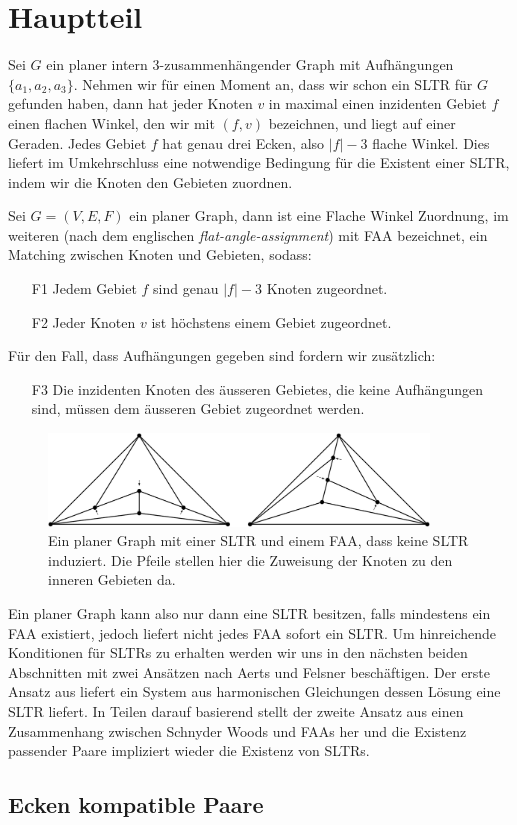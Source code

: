 \chapter{Hauptteil}

Sei $G$ ein planer intern 3-zusammenhängender Graph mit Aufhängungen $\{a_1,a_2,a_3\}$. Nehmen wir für einen Moment an, dass wir schon ein SLTR für $G$ gefunden haben, dann hat jeder Knoten $v$ in maximal einen inzidenten Gebiet $f$ einen flachen Winkel, den wir mit $(f,v)$ bezeichnen, und liegt auf einer Geraden. Jedes Gebiet $f$ hat genau drei Ecken, also $|f|-3$ flache Winkel. Dies liefert im Umkehrschluss eine notwendige Bedingung für die Existent einer SLTR, indem wir die Knoten den Gebieten zuordnen.

\begin{definition}[FAA]
Sei $G=(V,E,F)$ ein planer Graph, dann ist eine Flache Winkel Zuordnung, im weiteren (nach dem englischen \textit{flat-angle-assignment}) mit FAA bezeichnet, ein Matching zwischen Knoten und Gebieten, sodass:
\begin{itemize}
\item [F1] Jedem Gebiet $f$ sind genau $|f|-3$ Knoten zugeordnet.
\item [F2] Jeder Knoten $v$ ist höchstens einem Gebiet zugeordnet.
\end{itemize}
Für den Fall, dass Aufhängungen gegeben sind fordern wir zusätzlich:
\begin{itemize}
\item [F3] Die inzidenten Knoten des äusseren Gebietes, die keine Aufhängungen sind, müssen dem äusseren Gebiet zugeordnet werden.
\end{itemize}

\begin{figure}[h]
	\centering
  \includegraphics[width=0.9\textwidth]{faa_def.png}
  \caption{Ein planer Graph mit einer SLTR und einem FAA, dass keine SLTR induziert. Die Pfeile stellen hier die Zuweisung der Knoten zu den inneren Gebieten da.}
\end{figure}

\end{definition}

Ein planer Graph kann also nur dann eine SLTR besitzen, falls mindestens ein FAA existiert, jedoch liefert nicht jedes FAA sofort ein SLTR. Um hinreichende Konditionen für SLTRs zu erhalten werden wir uns in den nächsten beiden Abschnitten mit zwei Ansätzen nach Aerts und Felsner beschäftigen. Der erste Ansatz aus \cite{af13} liefert ein System aus harmonischen Gleichungen dessen Lösung eine SLTR liefert. In Teilen darauf basierend stellt der zweite Ansatz aus \cite{af15} einen Zusammenhang zwischen Schnyder Woods und FAAs her und die Existenz passender Paare impliziert wieder die Existenz von SLTRs.



\section{Ecken kompatible Paare}
